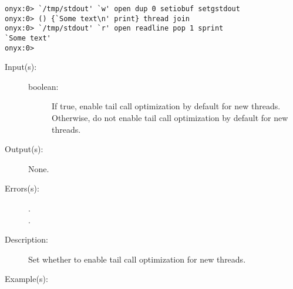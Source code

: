 \begin{description}
\begin{description}
\begin{verbatim}
onyx:0> `/tmp/stdout' `w' open dup 0 setiobuf setgstdout
onyx:0> () {`Some text\n' print} thread join
onyx:0> `/tmp/stdout' `r' open readline pop 1 sprint
`Some text'
onyx:0>
		\end{verbatim}
	\end{description}
\label{systemdict:setgtailopt}
\item[{\onyxop{boolean}{setgtailopt}{--}}: ]
	\begin{description}\item[]
	\item[Input(s): ]
		\begin{description}\item[]
		\item[boolean: ]
			If true, enable tail call optimization by default for
			new threads.  Otherwise, do not enable tail call
			optimization by default for new threads.
		\end{description}
	\item[Output(s): ] None.
	\item[Errors(s): ]
		\begin{description}\item[]
		\item[.]
		\item[.]
		\end{description}
	\item[Description: ]
		Set whether to enable tail call optimization for new threads.
	\item[Example(s): ]\begin{verbatim}


\end{verbatim}
\end{description}
\end{description}
